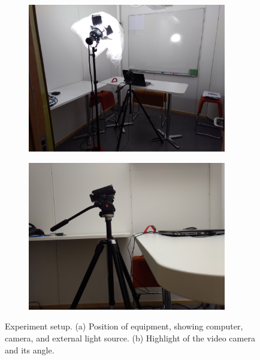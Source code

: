 \begin{figure}[ht]
\centering
  \begin{subfigure}[b]{0.5\textwidth}
    \includegraphics[width=0.95\textwidth]{Content/figures/experiment2-setup-overall}
    \caption{}
    \label{fig:experiment2-setup-overall}
  \end{subfigure}%
  \begin{subfigure}[b]{0.5\textwidth}
    \centering
    \includegraphics[width=0.95\textwidth]{Content/figures/experiment2-setup-camera}
    \caption{}
    \label{fig:experiment2-setup-camera}
  \end{subfigure}
  \caption{Experiment setup. (a) Position of equipment, showing computer, camera, and external light source. (b) Highlight of the video camera and its angle.}
  \label{fig:experiment2-setup}
\end{figure}

